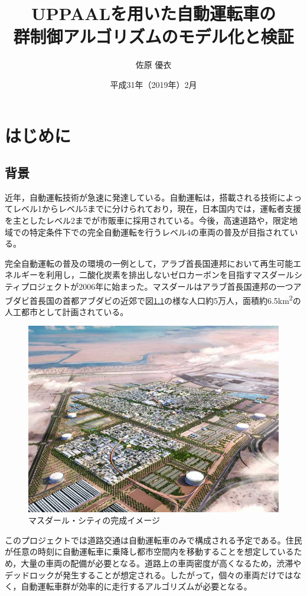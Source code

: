 \documentclass{tpu-sotu}
\title{UPPAALを用いた自動運転車の\\群制御アルゴリズムのモデル化と検証}
\author{佐原 優衣}
\date{平成31年（2019年）2月}
\begin{document}
\maketitle
\clearpage

\setcounter{tocdepth}{2}
\tableofcontents
\clearpage
{}

\chapter{はじめに}
	\section{背景}
	近年，自動運転技術が急速に発達している。自動運転は，搭載される技術によってレベル1からレベル5までに分けられており，現在，日本国内では，運転者支援を主としたレベル2までが市販車に採用されている。今後，高速道路や，限定地域での特定条件下での完全自動運転を行うレベル4の車両の普及が目指されている。
	
	完全自動運転の普及の環境の一例として，アラブ首長国連邦において再生可能エネルギーを利用し，二酸化炭素を排出しないゼロカーボンを目指すマスダールシティプロジェクトが2006年に始まった。マスダールはアラブ首長国連邦の一つアブダビ首長国の首都アブダビの近郊で図\ref{Masdar}の様な人口約5万人，面積約6.5\si{km^{2}}の人工都市として計画されている。
	
	\begin{figure}[htbp]
	\centering
	\includegraphics[width=130mm]{Masdar.jpg}
	\caption{マスダール・シティの完成イメージ \protect \footnotemark}
	\label{Masdar}
	\end{figure}
	このプロジェクトでは道路交通は自動運転車のみで構成される予定である。住民が任意の時刻に自動運転車に乗降し都市空間内を移動することを想定しているため，大量の車両の配備が必要となる。道路上の車両密度が高くなるため，渋滞やデッドロックが発生することが想定される。したがって，個々の車両だけではなく，自動運転車群が効率的に走行するアルゴリズムが必要となる。
	
\end{document}
